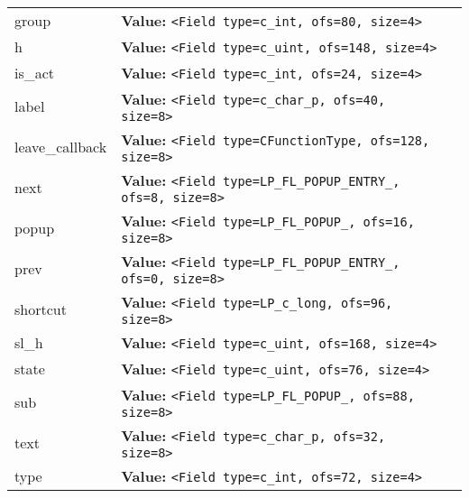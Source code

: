 \begin{longtable}{|p{\varnamewidth}|p{\vardescrwidth}|l}
\cline{1-2}
\raggedright g\-r\-o\-u\-p\- & \raggedright \textbf{Value:} 
{\tt {\textless}Field type=c\_int, ofs=80, size=4{\textgreater}}&\\
\cline{1-2}
\raggedright h\- & \raggedright \textbf{Value:} 
{\tt {\textless}Field type=c\_uint, ofs=148, size=4{\textgreater}}&\\
\cline{1-2}
\raggedright i\-s\-\_\-a\-c\-t\- & \raggedright \textbf{Value:} 
{\tt {\textless}Field type=c\_int, ofs=24, size=4{\textgreater}}&\\
\cline{1-2}
\raggedright l\-a\-b\-e\-l\- & \raggedright \textbf{Value:} 
{\tt {\textless}Field type=c\_char\_p, ofs=40, size=8{\textgreater}}&\\
\cline{1-2}
\raggedright l\-e\-a\-v\-e\-\_\-c\-a\-l\-l\-b\-a\-c\-k\- & \raggedright \textbf{Value:} 
{\tt {\textless}Field type=CFunctionType, ofs=128, size=8{\textgreater}}&\\
\cline{1-2}
\raggedright n\-e\-x\-t\- & \raggedright \textbf{Value:} 
{\tt {\textless}Field type=LP\_FL\_POPUP\_ENTRY\_, ofs=8, size=8{\textgreater}}&\\
\cline{1-2}
\raggedright p\-o\-p\-u\-p\- & \raggedright \textbf{Value:} 
{\tt {\textless}Field type=LP\_FL\_POPUP\_, ofs=16, size=8{\textgreater}}&\\
\cline{1-2}
\raggedright p\-r\-e\-v\- & \raggedright \textbf{Value:} 
{\tt {\textless}Field type=LP\_FL\_POPUP\_ENTRY\_, ofs=0, size=8{\textgreater}}&\\
\cline{1-2}
\raggedright s\-h\-o\-r\-t\-c\-u\-t\- & \raggedright \textbf{Value:} 
{\tt {\textless}Field type=LP\_c\_long, ofs=96, size=8{\textgreater}}&\\
\cline{1-2}
\raggedright s\-l\-\_\-h\- & \raggedright \textbf{Value:} 
{\tt {\textless}Field type=c\_uint, ofs=168, size=4{\textgreater}}&\\
\cline{1-2}
\raggedright s\-t\-a\-t\-e\- & \raggedright \textbf{Value:} 
{\tt {\textless}Field type=c\_uint, ofs=76, size=4{\textgreater}}&\\
\cline{1-2}
\raggedright s\-u\-b\- & \raggedright \textbf{Value:} 
{\tt {\textless}Field type=LP\_FL\_POPUP\_, ofs=88, size=8{\textgreater}}&\\
\cline{1-2}
\raggedright t\-e\-x\-t\- & \raggedright \textbf{Value:} 
{\tt {\textless}Field type=c\_char\_p, ofs=32, size=8{\textgreater}}&\\
\cline{1-2}
\raggedright t\-y\-p\-e\- & \raggedright \textbf{Value:} 
{\tt {\textless}Field type=c\_int, ofs=72, size=4{\textgreater}}&\\

\end{longtable}
